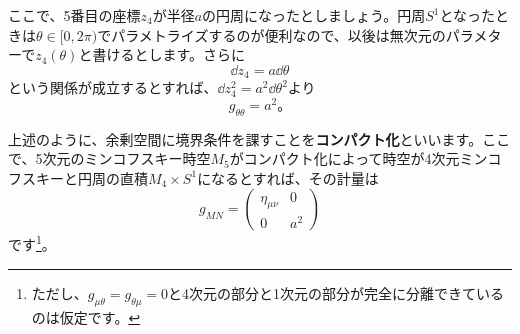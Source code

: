 \documentclass[unicode,a4paper,11pt]{ltjsarticle}
\begin{document}
ここで、5番目の座標$z_{4}$が半径$a$の円周になったとしましょう。円周$S^{1}$となったときは$\theta\in[0,2\pi)$でパラメトライズするのが便利なので、以後は無次元のパラメターで$z_{4}(\theta)$と書けるとします。さらに
\begin{equation}
   \dd z_{4}
   =
   a\dd \theta
\end{equation}
という関係が成立するとすれば、$\dd z_{4}^2=a^2\dd \theta^2$より
\begin{equation}
   g_{\theta\theta}=a^2
   。
\end{equation}

上述のように、余剰空間に境界条件を課すことを\textbf{コンパクト化}といいます。ここで、5次元のミンコフスキー時空$M_{5}$がコンパクト化によって時空が4次元ミンコフスキーと円周の直積$M_{4}\times S^{1}$になるとすれば、その計量は
\begin{equation}
   g_{MN}
   =
   \begin{pmatrix}
      \eta_{\mu\nu} & 0   \\
      0             & a^2
   \end{pmatrix}
\end{equation}
です\footnote{
ただし、$g_{\mu\theta}=g_{\theta\mu}=0$と4次元の部分と1次元の部分が完全に分離できているのは仮定です。
}。
\end{document}
